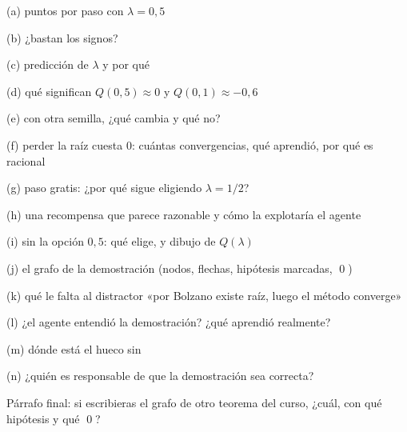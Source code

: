 \clearpage
{}

\begin{respuesta}[1.6cm]{(a) puntos por paso con $\lambda = 0{,}5$}\end{respuesta}
\begin{respuesta}[1.6cm]{(b) ¿bastan los signos?}\end{respuesta}
\begin{respuesta}[1.9cm]{(c) predicción de $\lambda$ y por qué}\end{respuesta}
\begin{respuesta}[1.9cm]{(d) qué significan $Q(0{,}5)\approx 0$ y $Q(0{,}1)\approx -0{,}6$}\end{respuesta}
\begin{respuesta}[1.6cm]{(e) con otra semilla, ¿qué cambia y qué no?}\end{respuesta}
\begin{respuesta}[3.2cm]{(f) perder la raíz cuesta 0: cuántas convergencias, qué aprendió, por qué es racional}\end{respuesta}
\begin{respuesta}[1.9cm]{(g) paso gratis: ¿por qué sigue eligiendo $\lambda = 1/2$?}\end{respuesta}
\begin{respuesta}[2.6cm]{(h) una recompensa que parece razonable y cómo la explotaría el agente}\end{respuesta}
\begin{respuesta}[2.4cm]{(i) sin la opción $0{,}5$: qué elige, y dibujo de $Q(\lambda)$}\end{respuesta}

\clearpage
\begin{respuesta}[8.5cm]{(j) el grafo de la demostración (nodos, flechas, hipótesis marcadas, \qed)}\end{respuesta}
\begin{respuesta}[2.0cm]{(k) qué le falta al distractor «por Bolzano existe raíz, luego el método converge»}\end{respuesta}
\begin{respuesta}[2.0cm]{(l) ¿el agente entendió la demostración? ¿qué aprendió realmente?}\end{respuesta}
\begin{respuesta}[2.6cm]{(m) dónde está el hueco sin }\end{respuesta}
\begin{respuesta}[2.0cm]{(n) ¿quién es responsable de que la demostración sea correcta?}\end{respuesta}
\begin{respuesta}[4.2cm]{Párrafo final: si escribieras el grafo de otro teorema del curso, ¿cuál, con qué hipótesis y qué \qed?}\end{respuesta}


